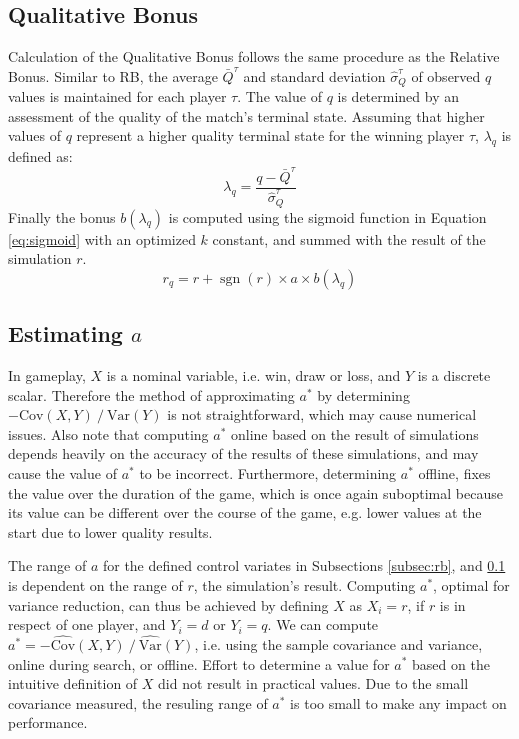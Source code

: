 \documentclass{ecai2014}
\newcommand{\sgn}{\mathop{\mathrm{sgn}}}
\newcommand{\Var}[1]{\mathrm{Var}\left( #1 \right)}
\newcommand{\Cov}[1]{\mathrm{Cov}\left( #1 \right)}
\newcommand{\SVar}[1]{\mathrm{\widehat{Var}}\left( #1 \right)}
\newcommand{\SCov}[1]{\mathrm{\widehat{Cov}}\left( #1 \right)}
\begin{document}
\subsection{Qualitative Bonus}
\label{subsec:qb}
Calculation of the Qualitative Bonus follows the same procedure as the Relative Bonus. Similar to RB, the average $\bar{Q}^\tau$ and standard deviation $\hat{\sigma}^\tau_Q$ of observed $q$ values is maintained for each player $\tau$. The value of $q$ is determined by an assessment of the quality of the match's terminal state. Assuming that higher values of $q$ represent a higher quality terminal state for the winning player $\tau$, $\lambda_q$ is defined as:
\begin{equation}
\lambda_q = \frac{q - \bar{Q}^\tau}{\hat{\sigma}^\tau_Q}
\end{equation}
Finally the bonus $b(\lambda_q)$ is computed using the sigmoid function in Equation \ref{eq:sigmoid} with an optimized $k$ constant, and summed with the result of the simulation $r$.
\begin{equation}
r_q=r+\sgn(r)\times a \times b(\lambda_q)
\end{equation}

\subsection{Estimating $a$}
\label{subsec:astar}

In gameplay, $X$ is a nominal variable, i.e. win, draw or loss, and $Y$ is a discrete scalar. Therefore the method of approximating $a^*$ by determining $-\Cov{X,Y}\mathbin{/}\Var{Y}$ is not straightforward, which may cause numerical issues. Also note that computing $a^*$ online based on the result of simulations depends heavily on the accuracy of the results of these simulations, and may cause the value of $a^*$ to be incorrect. Furthermore, determining $a^*$ offline, fixes the value over the duration of the game, which is once again suboptimal because its value can be different over the course of the game, e.g. lower values at the start due to lower quality results.

The range of $a$ for the defined control variates in Subsections \ref{subsec:rb}, and \ref{subsec:qb} is dependent on the range of $r$, the simulation's result. Computing $a^*$, optimal for variance reduction, can thus be achieved by defining $X$ as $X_i=r$, if $r$ is in respect of one player, and $Y_i=d$ or $Y_i=q$. We can compute $a^*=-{\SCov{X,Y}}\mathbin{/}{\SVar{Y}}$, i.e. using the sample covariance and variance, online during search, or offline. Effort to determine a value for $a^*$ based on the intuitive definition of $X$ did not result in practical values. Due to the small covariance measured, the resuling range of $a^*$ is too small to make any impact on performance.
\end{document}
